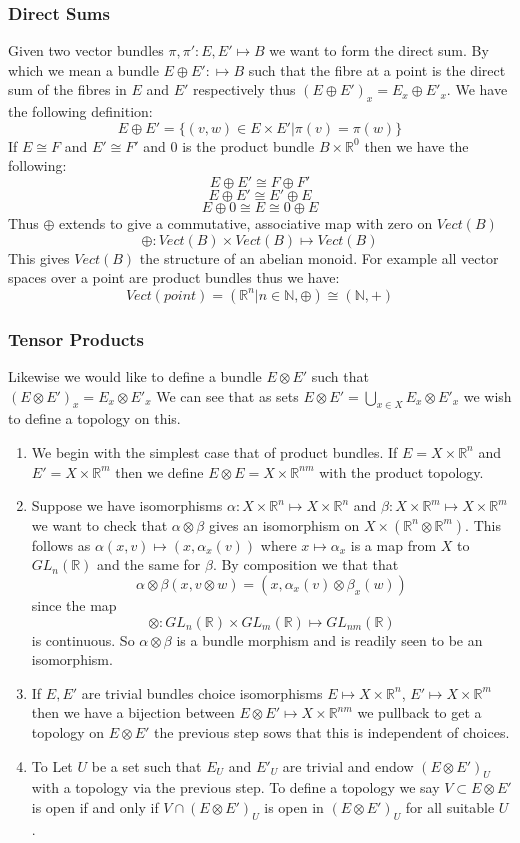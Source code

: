 \documentclass[a4paper,10pt]{article}
\theoremstyle{plain}%
\theoremstyle{definition}
\theoremstyle{remark}
\newcommand{\NN}{\mathbb{N}}
\newcommand{\RR}{\mathbb{R}}
\begin{document}
\subsubsection{Direct Sums}

Given two vector bundles $\pi,\pi':E,E'\mapsto B$ we want to form the direct sum. By which we mean a bundle 
$E\oplus E':\mapsto B$ such that the fibre at a point is the direct sum of the fibres in $E$
and $E'$ respectively thus $(E\oplus E')_x=E_x\oplus E'_x$. We have the following definition:
$$E\oplus E' = \{(v,w)\in E\times E' | \pi(v)=\pi(w) \}$$
If $E\cong F$ and $E'\cong F'$ and $0$ is the product bundle $B\times \RR^0$ then we have the following:
$$ E\oplus E'\cong F\oplus F'$$
$$ E\oplus E'\cong E'\oplus E$$
$$ E\oplus 0\cong E \cong 0\oplus E$$
Thus $\oplus$ extends to give a commutative, associative map with zero on $Vect(B)$
$$\oplus :Vect(B)\times Vect(B)\mapsto Vect(B)$$
This gives $Vect(B)$ the structure of an abelian monoid. For example all vector spaces over a point
are product bundles thus we have:
$$Vect(point)=({\RR^n|n\in\NN},\oplus)\cong (\NN,+)$$

\subsubsection{Tensor Products}

Likewise we would like to define a bundle $E\otimes E'$ such that $(E\otimes E')_x=E_x\otimes E'_x$
We can see that as sets $E\otimes E'=\bigcup_{x\in X}E_x\otimes E'_x$ we wish to define a topology on this.
\begin{enumerate}
 \item We begin with the simplest case that of product bundles. If $E=X\times \RR^n$ and $E'=X\times \RR^m$ 
then we define $E\otimes E = X\times \RR^{n m}$ with the product topology.
 \item Suppose we have isomorphisms $\alpha:X\times\RR^n\mapsto X\times\RR^n$ and 
$\beta:X\times\RR^m\mapsto X\times\RR^m$ we want to check that $\alpha\otimes\beta$ gives an
isomorphism on $X\times(\RR^n\otimes\RR^m)$. This follows as $\alpha(x,v)\mapsto(x,\alpha_x(v))$ where 
$x\mapsto\alpha_x$ is a map from $X$ to $GL_n(\RR)$ and the same for $\beta$. By composition we that that
$$\alpha\otimes\beta(x,v\otimes w)=(x,\alpha_x(v)\otimes\beta_x(w))$$
since the map
$$\otimes:GL_n(\RR)\times GL_m(\RR)\mapsto GL_{n m}(\RR)$$
is continuous. So $\alpha\otimes\beta$ is a bundle morphism and is readily seen to be an isomorphism. 
 \item If $E, E'$ are trivial bundles choice isomorphisms $E\mapsto X\times\RR^n$, $E'\mapsto X\times\RR^m$
then we have a bijection between $E\otimes E'\mapsto X\times\RR^{n m}$ we pullback to get a topology 
on $E\otimes E'$ the previous step sows that this is independent of choices.
 \item To Let $U$ be a set such that $E_U$ and $E'_U$ are trivial and endow $(E\otimes E')_U$ with a topology via the previous
step. To define a topology we say $V\subset E\otimes E'$ is open if and only if $V\cap (E\otimes E')_U$ is open in $(E\otimes E')_U$
for all suitable $U$.
\end{enumerate}
\end{document}
